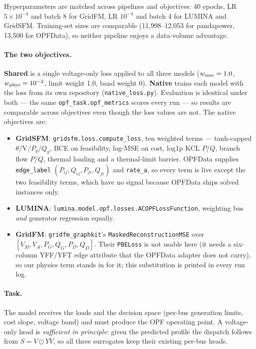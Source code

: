 \documentclass[10pt]{article}
\begin{document}
Hyperparameters are matched across pipelines and objectives: 40 epochs, LR
$5\times10^{-4}$ and batch 8 for GridFM, LR $10^{-4}$ and batch 4 for LUMINA and
GridSFM. Training-set sizes are comparable (11{,}998--12{,}053 for pandapower,
13{,}500 for OPFData), so neither pipeline enjoys a data-volume advantage.

\paragraph{The two objectives.} \textbf{Shared} is a single voltage-only loss
applied to all three models ($w_{\rm mse}=1.0$, $w_{\rm phys}=10^{-2}$, limit
weight 1.0, band weight 0). \textbf{Native} trains each model with the loss from
its own repository (\texttt{native\_loss.py}). Evaluation is identical under
both --- the same \texttt{opf\_task.opf\_metrics} scores every run --- so results
are comparable across objectives even though the loss values are not.
The native objectives are:

\begin{itemize}\itemsep2pt
\item \textbf{GridSFM}: \texttt{gridsfm.loss.compute\_loss}, ten weighted terms
--- tanh-capped $\theta$/V/$P_g$/$Q_g$, BCE on feasibility, log-MSE on cost,
log1p KCL $P$/$Q$, branch flow $P$/$Q$, thermal loading and a thermal-limit
barrier. OPFData supplies \texttt{edge\_label} $(P_{ij},Q_{ij},P_{ji},Q_{ji})$
and \texttt{rate\_a}, so every term is live except the two feasibility terms,
which have no signal because OPFData ships solved instances only.
\item \textbf{LUMINA}: \texttt{lumina.model.opf.losses.ACOPFLossFunction},
weighting bus \emph{and} generator regression equally.
\item \textbf{GridFM}: \texttt{gridfm\_graphkit}'s
\texttt{MaskedReconstructionMSE} over $[V_M, V_A, P_G, Q_G, P_D, Q_D]$. Their
\texttt{PBELoss} is not usable here (it needs a six-column YFF/YFT edge
attribute that the OPFData adapter does not carry), so our physics term stands
in for it; this substitution is printed in every run log.
\end{itemize}

\paragraph{Task.} The model receives the loads and the decision space
(per-bus generation limits, cost slope, voltage band) and must produce the OPF
operating point. A voltage-only head is \emph{sufficient in principle}: given
the predicted profile the dispatch follows from \(S = V \odot \overline{YV}\),
so all three surrogates keep their existing per-bus heads.
\end{document}
